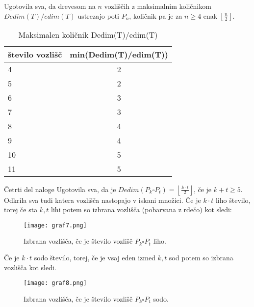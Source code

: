 \documentclass[12pt,a4paper]{amsart}
\makeatletter
\renewcommand\subsection{\@startsection{subsection}{2}%
  \z@{.5\linespacing\@plus.7\linespacing}{.5\linespacing}%
  {\normalfont\scshape}}
\theoremstyle{plain} %
\makeatother
\begin{document}
Ugotovila sva, da drevesom na $n$ vozliščih z maksimalnim količnikom \\
$Dedim(T)/edim(T)$ ustrezajo poti $P_{n}$, količnik pa je za $n\geq 4$ enak $\left\lfloor \frac{n}{2} \right\rfloor $.

\begin{table}[h]
    \begin{center}
      \begin{tabular}{l|c} %
        \textbf{število vozlišč} & \textbf{min(Dedim(T)/edim(T))} \\
        \hline
        4 & 2 \\
        5 & 2 \\
        6 & 3 \\
        7 & 3 \\
        8 & 4 \\
        9 & 4 \\
        10 & 5 \\
        11 & 5 \\
      \end{tabular}
    \end{center}
    \caption{Maksimalen količnik Dedim(T)/edim(T)}
    \label{tab:tabela4}
\end{table}

\subsection{Četrti del naloge}
Ugotovila sva, da je $Dedim(P_{k}\square P_{t}) = \left\lfloor \frac{k\cdot t}{2} \right\rfloor$, če je $k+t \geq 5$. Odkrila sva tudi katera vozlišča nastopajo v iskani množici. 
Če je $k\cdot t$ liho število, torej če sta $k,t$ lihi potem so izbrana vozlišča (pobarvana z rdečo) kot sledi:

\bigskip
\begin{figure}[h]
    \centering
    \texttt{[image: graf7.png]}
    \caption{Izbrana vozlišča, če je število vozlišč $P_{k}\square P_{t}$ liho.}
    \label{fig:slika2}
\end{figure}

\bigskip
Če je $k\cdot t$ sodo število, torej, če je vsaj eden izmed $k,t$ sod potem so izbrana vozlišča kot sledi.
\bigskip
\begin{figure}[h]
    \centering
    \texttt{[image: graf8.png]}
    \caption{Izbrana vozlišča, če je število vozlišč $P_{k}\square P_{t}$ sodo.}
    \label{fig:slika2}
\end{figure}
\end{document}
